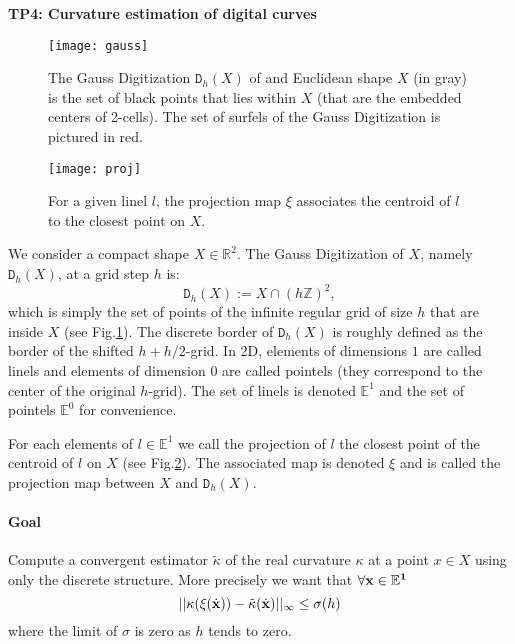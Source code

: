 \documentclass[a4paper, 11pt]{article}
\title{}
\author{}
\date{}
\begin{document}
\begin{center}
	\LARGE \textbf{TP4: Curvature estimation of digital curves}
\end{center}

\begin{figure}[!h]
  \centering
  \texttt{[image: gauss]}
  \caption{The Gauss Digitization $\mathtt{D}_h(X)$ of and Euclidean shape $X$ (in gray) is the set of black points that lies within $X$ (that are the embedded centers of 2-cells).
  The set of surfels of the Gauss Digitization is pictured in red. }
  \label{fig:gauss}
\end{figure}

\begin{figure}[!h]
  \centering
  \texttt{[image: proj]}
  \caption{For a given linel $l$, the projection map $\xi$ associates the centroid of $l$ to the closest point on $X$.}
  \label{fig:proj}
\end{figure}

We consider a compact shape $X \in \mathbb{R}^2$. The Gauss Digitization of $X$, namely $\mathtt{D}_h(X)$, at a grid step $h$ is:
\[
  \mathtt{D}_h(X) := X \cap (h\mathbb{Z})^{2},
\]
which is simply the set of points of the infinite regular grid of size $h$ that are inside $X$ (see Fig.\ref{fig:gauss}).
The discrete border of $\mathtt{D}_h(X)$ is roughly defined as the border of the shifted $h + h / 2$-grid. In 2D, elements of dimensions $1$ are called linels
and elements of dimension $0$ are called pointels (they correspond to the center of the original $h$-grid). The set of linels is denoted $\mathbb{E}^1$ and the set
of pointels $\mathbb{E}^0$ for convenience.

For each elements of $l \in \mathbb{E}^1$ we call the projection of $l$ the closest point of the centroid of $l$ on $X$ (see Fig.\ref{fig:proj}). The associated
map is denoted $\xi$ and is called the projection map between $X$ and $\mathtt{D}_h(X)$.

\paragraph{Goal} Compute a convergent estimator $\tilde{\kappa}$ of the real curvature $\kappa$ at a point $x \in X$ using only the discrete structure. More precisely we want that $\forall \bf{x} \in \mathbb{E}^1$
\[
  || \kappa( \xi( \dot{\bf{x}} ) ) - \tilde{\kappa}( \dot{\bf{x}} ) ||_\infty \leq \sigma( h )
\]
where the limit of $\sigma$ is zero as $h$ tends to zero.
\end{document}
